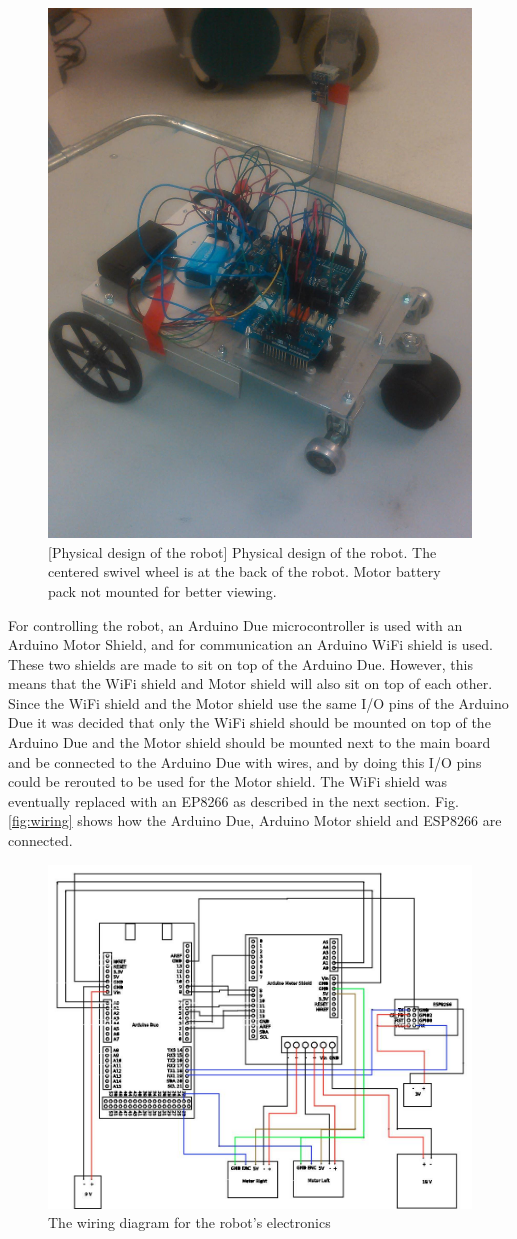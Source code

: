 \documentclass[11pt]{article}
\begin{document}
\begin{figure}[ht]
  \centering
  \includegraphics[width=.6\textwidth]{figures/robot.jpg}
  [Physical design of the robot]{\label{fig:robot} Physical
    design of the robot. The centered swivel wheel is at the back of the
    robot. Motor battery pack not mounted for better viewing.}
\end{figure}


For controlling the robot, an Arduino Due microcontroller is used with an
Arduino Motor Shield, and for communication an Arduino WiFi shield is
used. These two shields are made to sit on top of the Arduino Due. However, this
means that the WiFi shield and Motor shield will also sit on top of each
other. Since the WiFi shield and the Motor shield use the same I/O pins of the
Arduino Due it was decided that only the WiFi shield should be mounted on top of
the Arduino Due and the Motor shield should be mounted next to the main board
and be connected to the Arduino Due with wires, and by doing this I/O pins could
be rerouted to be used for the Motor shield. The WiFi shield was eventually
replaced with an EP8266 as described in the next section. Fig. \vref{fig:wiring}
shows how the Arduino Due, Arduino Motor shield and ESP8266 are connected. \par

\begin{figure}[ht]
  \centering
  \includegraphics[width=.75\textwidth]{figures/wiring.jpg}
  \caption{\label{fig:wiring} The wiring diagram for the robot's electronics}
\end{figure}
\end{document}
